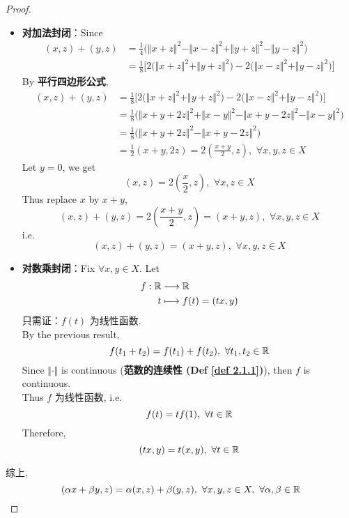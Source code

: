 \begin{thm}
\begin{proof}
			\begin{itemize}
				\item \textbf{对加法封闭}：Since
				\begin{align}
					(x , z) + (y , z) 
					&= \frac{1}{4} \Big( \Vert x + z \Vert^2 - \Vert x - z \Vert^2 + \Vert y + z \Vert^2 - \Vert y - z \Vert^2 \Big) \\
					&= \frac{1}{8} \Big[ 2 \Big( \Vert x + z \Vert^2 + \Vert y + z \Vert^2 \Big) - 2 \Big( \Vert x - z \Vert^2 + \Vert y - z \Vert^2 \Big) \Big]
				\end{align}
				By \textbf{平行四边形公式}, 
				\begin{align}
					(x , z) + (y , z) 
					&= \frac{1}{8} \Big[ 2 \Big( \Vert x + z \Vert^2 + \Vert y + z \Vert^2 \Big) - 2 \Big( \Vert x - z \Vert^2 + \Vert y - z \Vert^2 \Big) \Big] \\
					&= \frac{1}{8} \Big( \Vert x + y + 2z \Vert^2 + \Vert x - y \Vert^2 - \Vert x + y - 2z \Vert^2 - \Vert x - y \Vert^2 \Big) \\ 
					&= \frac{1}{8} \Big( \Vert x + y + 2z \Vert^2 - \Vert x + y - 2z \Vert^2 \Big) \\
					&= \frac{1}{2} (x + y , 2z) 
					= 2 \left( \frac{x + y}{2} , z \right) , \,\, \forall x , y , z \in X
				\end{align}
				Let $y = 0$, we get
				\[ (x , z) = 2 \left( \frac{x}{2} , z \right) , \,\, \forall x , z \in X \]
				Thus replace $x$ by $x + y$, 
				\[ (x , z) + (y , z) = 2 \left( \frac{x + y}{2} , z \right) = (x + y , z) , \,\, \forall x , y , z \in X \]
				i.e. 
				\[ (x , z) + (y , z) = (x + y , z) , \,\, \forall x , y , z \in X \]
				
				\newpage
				
				\item \textbf{对数乘封闭}：Fix $\forall x , y \in X$. Let
				\begin{align}
					f : \mathbb{R} &\longrightarrow \mathbb{R} \\
					t &\longmapsto f(t) = (tx , y)
				\end{align}
				只需证：$f(t)$ 为线性函数. \\
				By the previous result, 
				\[ f(t_1 + t_2) = f(t_1) + f(t_2) , \,\, \forall t_1 , t_2 \in \mathbb{R} \]
				Since $\Vert \cdot \Vert$ is continuous (\textbf{范数的连续性 (Def \ref{def 2.1.1})}), then $f$ is continuous. \\
				Thus $f$ 为线性函数, i.e.
				\[ f(t) = tf(1) , \,\, \forall t \in \mathbb{R} \]
				Therefore, 
				\[ (tx , y) = t(x , y) , \,\, \forall t \in \mathbb{R} \]
			\end{itemize}
			
			综上, 
			\[ (\alpha x + \beta y , z) = \alpha (x , z) + \beta (y , z) , \,\, \forall x , y , z \in X , \,\, \forall \alpha , \beta \in \mathbb{R} \]
		\end{proof}
	\end{thm}

